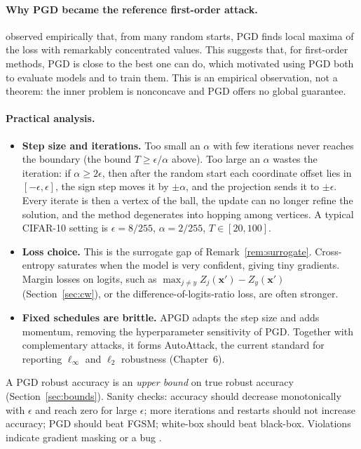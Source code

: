 \documentclass[10pt,a4paper]{extarticle}
\theoremstyle{definition}
\newcommand{\xadv}{\mathbf{x}'}
\begin{document}
\paragraph{Why PGD became the reference first-order attack.} \citet{madry2018towards} observed empirically that, from many random starts, PGD finds local maxima of the loss with remarkably concentrated values. This suggests that, for first-order methods, PGD is close to the best one can do, which motivated using PGD both to evaluate models and to train them. This is an empirical observation, not a theorem: the inner problem is nonconcave and PGD offers no global guarantee.

\paragraph{Practical analysis.}
\begin{itemize}
  \item \textbf{Step size and iterations.} Too small an \(\alpha\) with few iterations never reaches the boundary (the bound \(T\ge\epsilon/\alpha\) above). Too large an \(\alpha\) wastes the iteration: if \(\alpha\ge2\epsilon\), then after the random start each coordinate offset lies in \([-\epsilon,\epsilon]\), the sign step moves it by \(\pm\alpha\), and the projection sends it to \(\pm\epsilon\). Every iterate is then a vertex of the ball, the update can no longer refine the solution, and the method degenerates into hopping among vertices. A typical CIFAR-10 setting is \(\epsilon=8/255\), \(\alpha=2/255\), \(T\in[20,100]\).
  \item \textbf{Loss choice.} This is the surrogate gap of Remark~\ref{rem:surrogate}. Cross-entropy saturates when the model is very confident, giving tiny gradients. Margin losses on logits, such as \(\max_{j\neq y}Z_j(\xadv)-Z_y(\xadv)\) (Section~\ref{sec:cw}), or the difference-of-logits-ratio loss, are often stronger.
  \item \textbf{Fixed schedules are brittle.} APGD \citep{croce2020reliable} adapts the step size and adds momentum, removing the hyperparameter sensitivity of PGD. Together with complementary attacks, it forms AutoAttack, the current standard for reporting \(\ell_\infty\) and \(\ell_2\) robustness (Chapter~6).
\end{itemize}

\begin{warnbox}
A PGD robust accuracy is an \emph{upper bound} on true robust accuracy (Section~\ref{sec:bounds}). Sanity checks: accuracy should decrease monotonically with \(\epsilon\) and reach zero for large \(\epsilon\); more iterations and restarts should not increase accuracy; PGD should beat FGSM; white-box should beat black-box. Violations indicate gradient masking or a bug \citep{carlini2019evaluating}.
\end{warnbox}
\end{document}

